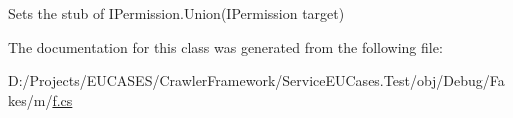Sets the stub of I\-Permission.\-Union(\-I\-Permission target)



The documentation for this class was generated from the following file\-:\begin{DoxyCompactItemize}
\item 
D\-:/\-Projects/\-E\-U\-C\-A\-S\-E\-S/\-Crawler\-Framework/\-Service\-E\-U\-Cases.\-Test/obj/\-Debug/\-Fakes/m/\hyperlink{m_2f_8cs}{f.\-cs}\end{DoxyCompactItemize}
